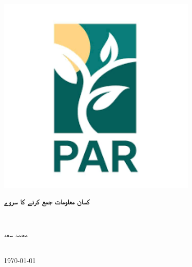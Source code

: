 \documentclass[12pt]{article}
\begin{document}
\begin{titlepage}
    \centering
    \vspace*{\fill} 
    \includegraphics[width=10cm]{img/logo2.png}\\[1cm]
    {\Large \begin{urdu} \textbf{کسان معلومات جمع کرنے کا سروے} \end{urdu}}\\[0.5cm]
    {\large \begin{urdu} محمد سعد \end{urdu}}\\[0.2cm]
    {\large \today}\\[0.5cm]
    \vspace*{\fill}
\end{titlepage}

\newpage
\end{document}
